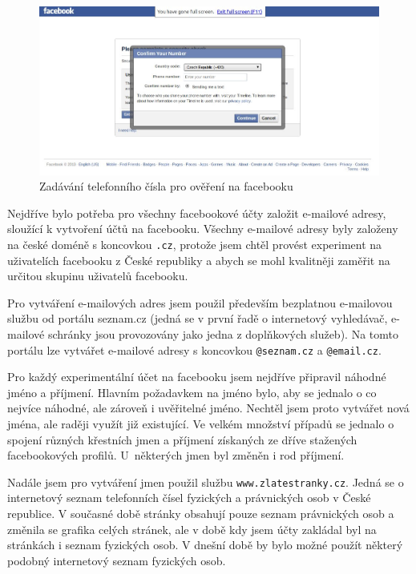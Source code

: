 \documentclass[thesis=M,czech]{FITthesis}[2013/05/10]
\begin{document}
\begin{figure}[h]
\begin{center}
\includegraphics[width=5in]{figures/fb-telephone-number2.jpg}
\caption{Zadávání telefonního čísla pro ověření na facebooku}
\label{fig:fbTelephoneNubmer}
\end{center}
\end{figure}

Nejdříve bylo potřeba pro všechny facebookové účty založit e-mailové adresy, sloužící k vytvoření účtů na facebooku. Všechny e-mailové adresy byly založeny na české doméně s koncovkou \verb|.cz|, protože jsem chtěl provést experiment na uživatelích facebooku z České republiky a abych se mohl kvalitněji zaměřit na určitou skupinu uživatelů facebooku. 

Pro vytváření e-mailových adres jsem použil především bezplatnou e-mailovou službu od portálu seznam.cz (jedná se v první řadě o internetový vyhledávač, e-mailové schránky jsou provozovány jako jedna z doplňkových služeb). Na tomto portálu lze vytvářet e-mailové adresy s koncovkou \verb|@seznam.cz| a \verb|@email.cz|.

Pro každý experimentální účet na facebooku jsem nejdříve připravil náhodné jméno a příjmení. Hlavním požadavkem na jméno bylo, aby se jednalo o co nejvíce náhodné, ale zároveň i uvěřitelné jméno. Nechtěl jsem proto vytvářet nová jména, ale raději využít již existující. Ve velkém množství případů se jednalo o spojení různých křestních jmen a příjmení získaných ze dříve stažených facebookových profilů. U~některých jmen byl změněn i rod příjmení. 

Nadále jsem pro vytváření jmen použil službu \verb|www.zlatestranky.cz|. Jedná se o internetový seznam telefonních čísel fyzických a právnických osob v České republice. V současné době stránky obsahují pouze seznam právnických osob a změnila se grafika celých stránek, ale v době kdy jsem účty zakládal byl na stránkách i seznam fyzických osob. V dnešní době by bylo možné použít některý podobný internetový seznam fyzických osob.
\end{document}
